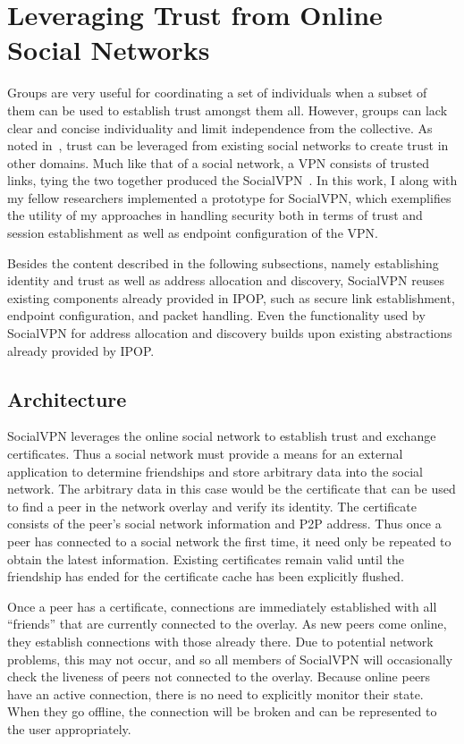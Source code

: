 \section{Leveraging Trust from Online Social Networks}

Groups are very useful for coordinating a set of individuals when a subset of
them can be used to establish trust amongst them all.  However, groups can lack
clear and concise individuality and limit independence from the collective.  As
noted in~\cite{socialvpn}, trust can be leveraged from existing social networks
to create trust in other domains.  Much like that of a social network, a VPN
consists of trusted links, tying the two together produced the
SocialVPN~\cite{socialvpn}.  In this work, I along with my fellow researchers
implemented a prototype for SocialVPN, which exemplifies the utility of my
approaches in handling security both in terms of trust and session
establishment as well as endpoint configuration of the VPN.

Besides the content described in the following subsections, namely establishing
identity and trust as well as address allocation and discovery, SocialVPN
reuses existing components already provided in IPOP, such as secure link
establishment, endpoint configuration, and packet handling.  Even the
functionality used by SocialVPN for address allocation and discovery builds
upon existing abstractions already provided by IPOP.

\subsection{Architecture}

SocialVPN leverages the online social network to establish trust and exchange
certificates.  Thus a social network must provide a means for an external
application to determine friendships and store arbitrary data into the social
network.  The arbitrary data in this case would be the certificate that can be
used to find a peer in the network overlay and verify its identity.  The
certificate consists of the peer's social network information and P2P address.
Thus once a peer has connected to a social network the first time, it need only
be repeated to obtain the latest information.  Existing certificates remain
valid until the friendship has ended for the certificate cache has been
explicitly flushed.

Once a peer has a certificate, connections are immediately established with all
``friends'' that are currently connected to the overlay.  As new peers come
online, they establish connections with those already there.  Due to potential
network problems, this may not occur, and so all members of SocialVPN will
occasionally check the liveness of peers not connected to the overlay.  Because
online peers have an active connection, there is no need to explicitly monitor
their state.  When they go offline, the connection will be broken and can be
represented to the user appropriately.

